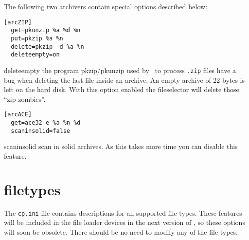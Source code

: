 The following two archivers contain special options described below:
\begin{verbatim}
[arcZIP]
  get=pkunzip %a %d %n
  put=pkzip %a %n
  delete=pkzip -d %a %n
  deleteempty=on
\end{verbatim}
\begin{dojlist}
\item[deleteempty] the program pkzip/pkunzip used by \cp\ to process 
\texttt{.zip} files have a bug when deleting the last file inside an archive. 
An empty archive of 22 bytes is left on the hard disk. With this
option enabled the fileselector will delete those ``zip zombies''.
\end{dojlist}

\begin{verbatim}
[arcACE]
  get=ace32 e %a %n %d
  scaninsolid=false
\end{verbatim}
\begin{dojlist}
\item[scaninsolid] scan in solid archives. As this takes more time you can
disable this feature.
\end{dojlist}

\section{filetypes}
The \texttt{cp.ini} file contains descriptions for all supported file
types.  These features will be included in the file loader devices in
the next version of \cp, so these options will soon be obsolete. There
should be no need to modify any of the file types.
